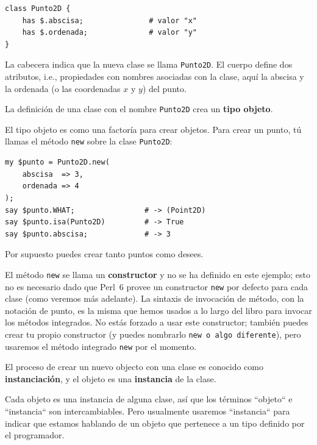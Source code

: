 \begin{lstlisting}
class Punto2D {
    has $.abscisa;               # valor "x"
    has $.ordenada;              # valor "y" 
}
\end{lstlisting}
%
La cabecera indica que la nueva clase se llama {\tt Punto2D}. 
El cuerpo define dos atributos, i.e., propiedades con nombres
asociadas con la clase, aquí la abscisa y la ordenada 
(o las coordenadas $x$ y $y$) del punto.

La definición de una clase con el nombre {\tt Punto2D} crea
un {\bf tipo objeto}.

El tipo objeto es como una factoría para crear objetos. Para crear
un punto, tú llamas el método {\tt new} sobre la clase {\tt Punto2D}:

\begin{lstlisting}
my $punto = Punto2D.new( 
    abscisa  => 3, 
    ordenada => 4
);
say $punto.WHAT;                # -> (Point2D)
say $punto.isa(Punto2D)         # -> True
say $punto.abscisa;             # -> 3
\end{lstlisting}
%
Por supuesto puedes crear tanto puntos como desees.

El método {\tt new} se llama un {\bf constructor} y no se ha 
definido en este ejemplo; esto no es necesario dado que 
Perl~6 provee un constructor {\tt new} por defecto para 
cada clase (como veremos más adelante). La sintaxis de invocación
de método, con la notación de punto, es la misma que hemos 
usados a lo largo del libro para invocar los métodos integrados.
No estás forzado a usar este constructor; también puedes crear
tu propio constructor (y puedes nombrarlo {\tt new o algo diferente}),
pero usaremos el método integrado {\tt new} por el momento.

El proceso de crear un nuevo objecto con una clase es conocido
como {\bf instanciación}, y el objeto es una {\bf instancia} de la
clase.

Cada objeto es una instancia de alguna clase, 
así que los términos ``objeto`` e ``instancia`` son
intercambiables. Pero usualmente usaremos ``instancia``
para indicar que estamos hablando de un objeto que pertenece
a un tipo definido por el programador.

